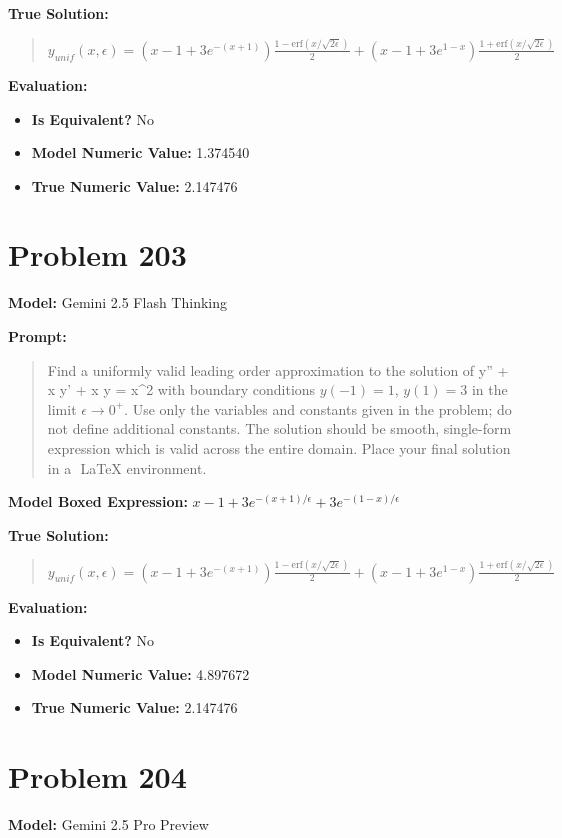 \documentclass{article}
\begin{document}
{\textbf{True Solution:}
\begin{quote}
$y_{unif}(x, \epsilon) = \left(x - 1 + 3e^{-(x+1)}\right) \frac{1-\text{erf}(x/\sqrt{2\epsilon})}{2} + \left(x - 1 + 3e^{1-x}\right) \frac{1+\text{erf}(x/\sqrt{2\epsilon})}{2}$
\end{quote}

\textbf{Evaluation:}
\begin{itemize}
\item \textbf{Is Equivalent?} No
\item \textbf{Model Numeric Value:} 1.374540
\item \textbf{True Numeric Value:} 2.147476
\end{itemize}
\vspace{1cm}
\section*{Problem 203}
\textbf{Model:} Gemini 2.5 Flash Thinking

\textbf{Prompt:}
\begin{quote}
Find a uniformly valid leading order approximation to the solution of \epsilon y'' + x y' + x y = x^2 with boundary conditions $y(-1) = 1$, $y(1) = 3$ in the limit $\epsilon \to 0^+$. Use only the variables and constants given in the problem; do not define additional constants. The solution should be smooth, single-form expression which is valid across the entire domain. Place your final solution in a $\boxed{}$ LaTeX environment.
\end{quote}
\textbf{Model Boxed Expression:} $x-1 + 3e^{-(x+1)/\epsilon} + 3e^{-(1-x)/\epsilon}$

\textbf{True Solution:}
\begin{quote}
$y_{unif}(x, \epsilon) = \left(x - 1 + 3e^{-(x+1)}\right) \frac{1-\text{erf}(x/\sqrt{2\epsilon})}{2} + \left(x - 1 + 3e^{1-x}\right) \frac{1+\text{erf}(x/\sqrt{2\epsilon})}{2}$
\end{quote}

\textbf{Evaluation:}
\begin{itemize}
\item \textbf{Is Equivalent?} No
\item \textbf{Model Numeric Value:} 4.897672
\item \textbf{True Numeric Value:} 2.147476
\end{itemize}
\vspace{1cm}
\section*{Problem 204}
\textbf{Model:} Gemini 2.5 Pro Preview

}
\end{document}
